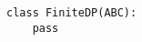 \par\begin{minipage}{60ex}
\begin{verbatim}
class FiniteDP(ABC):
    pass
\end{verbatim}
\end{minipage}\par
